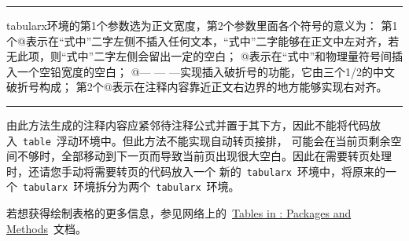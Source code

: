 \noindent\hrule\vspace{1em}

   tabularx环境的第1个参数选为正文宽度，第2个参数里面各个符号的意义为：
   第1个@{}表示在“式中”二字左侧不插入任何文本，“式中”二字能够在正文中左对齐，若无此项，则“式中”二字左侧会留出一定的空白；
   @{\quad}表示在“式中”和物理量符号间插入一个空铅宽度的空白；
   @{— — —}实现插入破折号的功能，它由三个1/2的中文破折号构成；
   第2个@{}表示在注释内容靠近正文右边界的地方能够实现右对齐。
\vspace{1em}
\noindent\hrule\vspace{1em}

由此方法生成的注释内容应紧邻待注释公式并置于其下方，因此不能将代码放入~\verb|table|~浮动环境中。但此方法不能实现自动转页接排，
可能会在当前页剩余空间不够时，全部移动到下一页而导致当前页出现很大空白。因此在需要转页处理时，还请您手动将需要转页的代码放入一个
新的~\verb|tabularx|~环境中，将原来的一个~\verb|tabularx|~环境拆分为两个~\verb|tabularx|~环境。

若想获得绘制表格的更多信息，参见网络上的~\href{http://www.tug.org/pracjourn/2007-1/mori/}{Tables in \LaTeXe: Packages and Methods}~文档。

